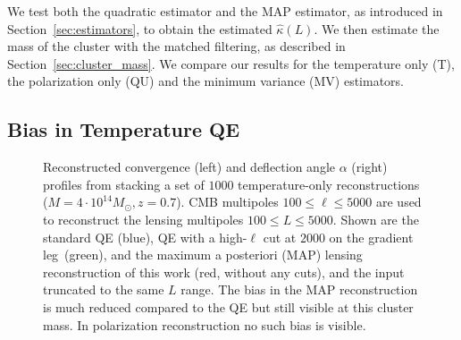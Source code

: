 \documentclass[prd, superscriptaddress, tightenlines, longbibliography, nofootinbib, eqsecnum, amsfonts, amsmath, floatfix, twocolumn, notitlepage]{revtex4-2}
\newcommand{\JC}[1]{\color{purple}{{JC:#1}}\color{black}\xspace}
\newcommand{\LL}[1]{{\color{orange}{LL: #1}}}
\begin{document}
We test both the quadratic estimator and the MAP estimator, as introduced in Section~\ref{sec:estimators}, to obtain the estimated $\hat{\kappa}(L)$.
We then estimate the mass of the cluster with the matched filtering, as described in Section~\ref{sec:cluster_mass}. We compare our results for the temperature only (T), the polarization only (QU) and the minimum variance (MV) estimators.


\subsection{Bias in Temperature QE}

\begin{figure}
  \caption{Reconstructed convergence (left) and deflection angle $\alpha$ (right) profiles from  stacking a set of $1000$ temperature-only reconstructions ($M = 4 \cdot 10^{14} M_\odot, z=0.7$). CMB multipoles $100 \leq \ell \leq 5000$ are used to reconstruct the lensing multipoles $100 \leq L \leq 5000$. Shown are the standard QE (blue), QE with a high-$\ell$ cut at $2000$ on the gradient leg~\cite{Hu:2007bt}(green), and the maximum a posteriori (MAP) lensing reconstruction of this work (red, without any cuts), and the input truncated to the same $L$ range. The bias in the MAP reconstruction is much reduced compared to the QE but still visible at this cluster mass. In polarization reconstruction no such bias is visible.\JC{QE and MAP, right ?}}
  \label{fig:Bias_sup}
  \end{figure}
\end{document}
